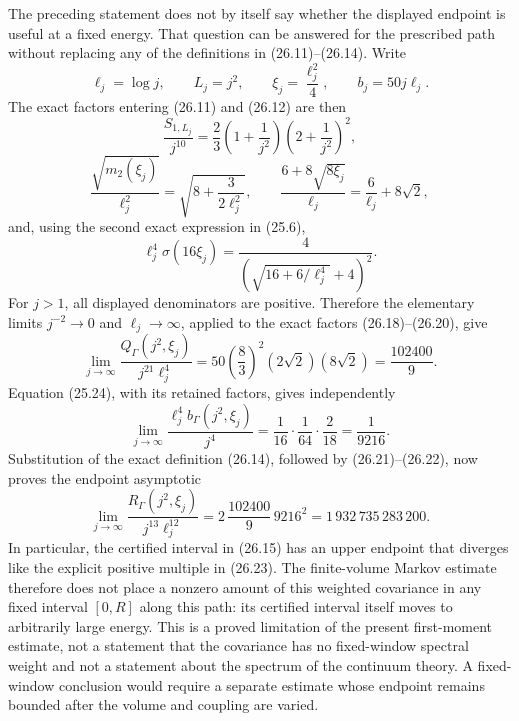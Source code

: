 \documentclass[
]{article}
\begin{document}
The preceding statement does not by itself say whether the displayed endpoint
is useful at a fixed energy. That question can be answered for the prescribed
path without replacing any of the definitions in (26.11)--(26.14). Write \[
 \ell_j=\log j,\qquad L_j=j^2,\qquad \xi_j=\frac{\ell_j^2}{4},
 \qquad b_j=50j\ell_j.
 \tag{26.17}
\] The exact factors entering (26.11) and (26.12) are then \[
 \frac{S_{1,L_j}}{j^{10}}
 =\frac23\left(1+\frac1{j^2}\right)
             \left(2+\frac1{j^2}\right)^2,
 \tag{26.18}
\] \[
 \frac{\sqrt{m_2(\xi_j)}}{\ell_j^2}
 =\sqrt{8+\frac{3}{2\ell_j^2}},
 \qquad
 \frac{6+8\sqrt{8\xi_j}}{\ell_j}
 =\frac6{\ell_j}+8\sqrt2,
 \tag{26.19}
\] and, using the second exact expression in (25.6), \[
 \ell_j^4\sigma(16\xi_j)
 =\frac{4}{\left(\sqrt{16+6/\ell_j^4}+4\right)^2}.
 \tag{26.20}
\] For \(j>1\), all displayed denominators are positive. Therefore the
 elementary limits \(j^{-2}\to0\) and \(\ell_j\to\infty\), applied to the
 exact factors (26.18)--(26.20), give \[
 \lim_{j\to\infty}
 \frac{Q_\Gamma(j^2,\xi_j)}{j^{21}\ell_j^4}
 =50\left(\frac83\right)^2(2\sqrt2)(8\sqrt2)
 =\frac{102400}{9}.
 \tag{26.21}
\] Equation (25.24), with its retained factors, gives independently \[
 \lim_{j\to\infty}
 \frac{\ell_j^4 b_\Gamma(j^2,\xi_j)}{j^4}
 =\frac1{16}\cdot\frac1{64}\cdot\frac2{18}
 =\frac1{9216}.
 \tag{26.22}
\] Substitution of the exact definition (26.14), followed by (26.21)--(26.22),
 now proves the endpoint asymptotic \[
 \boxed{\displaystyle
 \lim_{j\to\infty}
 \frac{R_\Gamma(j^2,\xi_j)}{j^{13}\ell_j^{12}}
 =2\,\frac{102400}{9}\,9216^2
 =1\,932\,735\,283\,200.}
 \tag{26.23}
\] In particular, the certified interval in (26.15) has an upper endpoint that
 diverges like the explicit positive multiple in (26.23). The finite-volume
 Markov estimate therefore does not place a nonzero amount of this weighted
 covariance in any fixed interval \([0,R]\) along this path: its certified
 interval itself moves to arbitrarily large energy. This is a proved limitation
 of the present first-moment estimate, not a statement that the covariance has
 no fixed-window spectral weight and not a statement about the spectrum of the
 continuum theory. A fixed-window conclusion would require a separate estimate
 whose endpoint remains bounded after the volume and coupling are varied.
\end{document}

